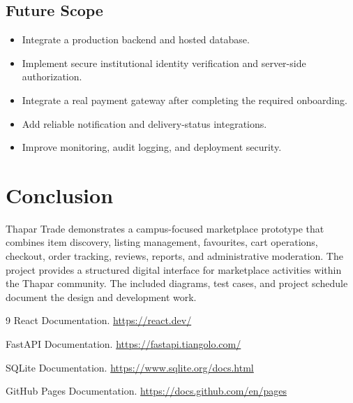 \documentclass[12pt,a4paper]{report}
\begin{document}
\section{Future Scope}
\begin{itemize}
    \item Integrate a production backend and hosted database.
    \item Implement secure institutional identity verification and server-side authorization.
    \item Integrate a real payment gateway after completing the required onboarding.
    \item Add reliable notification and delivery-status integrations.
    \item Improve monitoring, audit logging, and deployment security.
\end{itemize}

\chapter{Conclusion}
Thapar Trade demonstrates a campus-focused marketplace prototype that combines
item discovery, listing management, favourites, cart operations, checkout,
order tracking, reviews, reports, and administrative moderation. The project
provides a structured digital interface for marketplace activities within the
Thapar community. The included diagrams, test cases, and project schedule
document the design and development work.

\begin{thebibliography}{9}
React Documentation. \url{https://react.dev/}

FastAPI Documentation. \url{https://fastapi.tiangolo.com/}

SQLite Documentation. \url{https://www.sqlite.org/docs.html}

GitHub Pages Documentation. \url{https://docs.github.com/en/pages}
\end{thebibliography}
\end{document}
